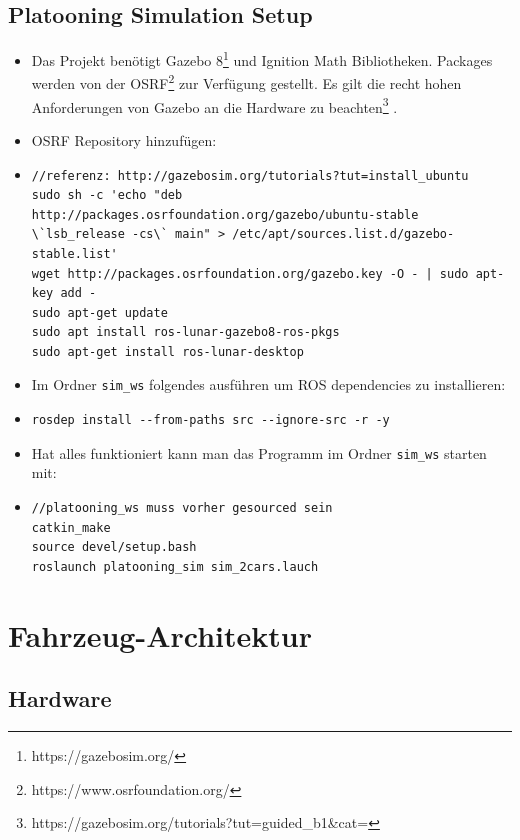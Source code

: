 \documentclass[a4paper, 12pt, titlepage]{scrartcl}
\begin{document}
	\subsection{Platooning Simulation Setup}
	\begin{itemize}
		\item Das Projekt benötigt Gazebo 8\footnote{https://gazebosim.org/} und Ignition Math Bibliotheken. Packages werden von der OSRF\footnote{https://www.osrfoundation.org/} zur Verfügung gestellt. Es gilt die recht hohen Anforderungen von Gazebo an die Hardware zu beachten\footnote{https://gazebosim.org/tutorials?tut=guided\_b1\&cat=} .
		\item OSRF Repository hinzufügen:
		\item[] \begin{lstlisting}
//referenz: http://gazebosim.org/tutorials?tut=install_ubuntu
sudo sh -c 'echo "deb http://packages.osrfoundation.org/gazebo/ubuntu-stable \`lsb_release -cs\` main" > /etc/apt/sources.list.d/gazebo-stable.list'
wget http://packages.osrfoundation.org/gazebo.key -O - | sudo apt-key add -
sudo apt-get update
sudo apt install ros-lunar-gazebo8-ros-pkgs
sudo apt-get install ros-lunar-desktop
		\end{lstlisting}
		\item Im Ordner \texttt{sim\_ws} folgendes ausführen um ROS dependencies zu installieren:
		\item[] \begin{lstlisting}
rosdep install --from-paths src --ignore-src -r -y
		\end{lstlisting}
		\item Hat alles funktioniert kann man das Programm im Ordner \texttt{sim\_ws} starten mit:
		\item[] \begin{lstlisting}
//platooning_ws muss vorher gesourced sein
catkin_make
source devel/setup.bash
roslaunch platooning_sim sim_2cars.lauch
		\end{lstlisting}
	\end{itemize}
	\section{Fahrzeug-Architektur}
	\label{hw_architektur}
		\subsection{Hardware}
		\label{hardware}
\end{document}
